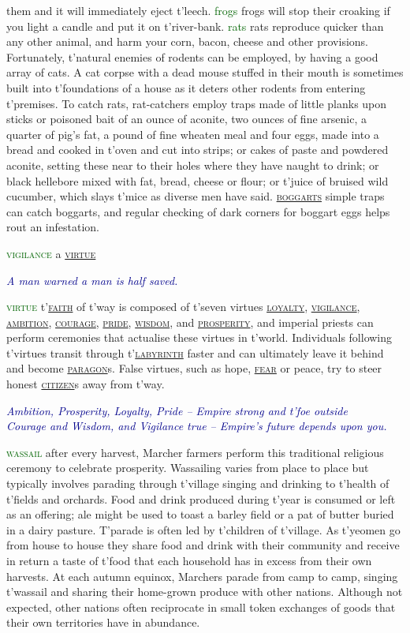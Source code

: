 \documentclass[twoside,11pt,b5paper,twocolumn]{scrbook}
\newcommand{\estcab}[1]{\textsc{\textcolor{marron}{#1}}}
\newcommand{\keyword}[1]{\textcolor{darkgreen}{#1}}
\renewcommand{\paragraph}[1]{\par\noindent\markboth{#1}{#1}\estcab{\keyword{#1}}\label{#1} }
\newcommand{\see}[1]{{\estcab{\hyperref[#1]{#1}}}}
\newcommand{\proverb}[1]{\par \textcolor{darkblue}{\itshape #1}}
\begin{document}
them and it will immediately eject t'leech. \keyword{frogs} frogs will stop their croaking if you light a candle and put it on t'river-bank. \keyword{rats} rats reproduce quicker than any other animal, and harm your corn, bacon, cheese and other provisions. Fortunately, t'natural enemies of rodents can be employed, by having a good array of cats. A cat corpse with a dead mouse stuffed in their mouth is sometimes built into t'foundations of a house as it deters other rodents from entering t'premises. To catch rats, rat-catchers employ traps made of little planks upon sticks or poisoned bait of an ounce of aconite, two ounces of fine arsenic, a quarter of pig's fat, a pound of fine wheaten meal and four eggs, made into a bread and cooked in t'oven and cut into strips; or cakes of paste and powdered aconite, setting these near to their holes where they have naught to drink; or black hellebore mixed with fat, bread, cheese or flour; or t'juice of bruised wild cucumber, which slays t'mice as diverse men have said. \see{boggarts} simple traps can catch boggarts, and regular checking of dark corners for boggart eggs helps rout an infestation.
\paragraph{vigilance} a \see{virtue} \proverb{A man warned a man is half saved.}
\paragraph{virtue} t'\see{faith} of t'way is composed of t'seven virtues \see{loyalty}, \see{vigilance}, \see{ambition}, \see{courage}, \see{pride}, \see{wisdom}, and \see{prosperity}, and imperial priests can perform ceremonies that actualise these virtues in t'world. Individuals following t'virtues transit through t'\see{labyrinth} faster and can ultimately leave it behind and become \see{paragon}s. False virtues, such as hope, \see{fear} or peace, try to steer honest \see{citizen}s away from t'way. \proverb{Ambition, Prosperity, Loyalty, Pride – Empire strong and t'foe outside\\Courage and Wisdom, and Vigilance true – Empire's future depends upon you.}
\paragraph{wassail} after every harvest, Marcher farmers perform this traditional religious ceremony to celebrate prosperity. Wassailing varies from place to place but typically involves parading through t'village singing and drinking to t'health of t'fields and orchards. Food and drink produced during t'year is consumed or left as an offering; ale might be used to toast a barley field or a pat of butter buried in a dairy pasture. T'parade is often led by t'children of t'village. As t'yeomen go from house to house they share food and drink with their community and receive in return a taste of t'food that each household has in excess from their own harvests. At each autumn equinox, Marchers parade from camp to camp, singing t'wassail and sharing their home-grown produce with other nations. Although not expected, other nations often reciprocate in small token exchanges of goods that their own territories have in abundance.
\end{document}
